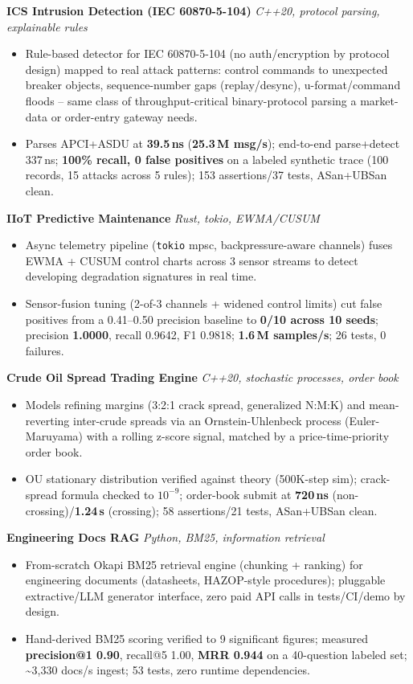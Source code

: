 \documentclass[10pt]{article}
\newcommand{\projectentry}[2]{%
  \noindent\textbf{#1} \hfill \textit{#2}\\[-0.3em]
}
\begin{document}
\projectentry{ICS Intrusion Detection (IEC 60870-5-104)}{C++20, protocol parsing, explainable rules}
\begin{itemize}
  \item Rule-based detector for IEC 60870-5-104 (no auth/encryption by protocol design) mapped to real attack patterns: control commands to unexpected breaker objects, sequence-number gaps (replay/desync), u-format/command floods -- same class of throughput-critical binary-protocol parsing a market-data or order-entry gateway needs.
  \item Parses APCI+ASDU at \textbf{39.5\,ns} (\textbf{25.3\,M msg/s}); end-to-end parse+detect 337\,ns; \textbf{100\% recall, 0 false positives} on a labeled synthetic trace (100 records, 15 attacks across 5 rules); 153 assertions/37 tests, ASan+UBSan clean.
\end{itemize}

\projectentry{IIoT Predictive Maintenance}{Rust, tokio, EWMA/CUSUM}
\begin{itemize}
  \item Async telemetry pipeline (\texttt{tokio} mpsc, backpressure-aware channels) fuses EWMA + CUSUM control charts across 3 sensor streams to detect developing degradation signatures in real time.
  \item Sensor-fusion tuning (2-of-3 channels + widened control limits) cut false positives from a 0.41--0.50 precision baseline to \textbf{0/10 across 10 seeds}; precision \textbf{1.0000}, recall 0.9642, F1 0.9818; \textbf{1.6\,M samples/s}; 26 tests, 0 failures.
\end{itemize}

\projectentry{Crude Oil Spread Trading Engine}{C++20, stochastic processes, order book}
\begin{itemize}
  \item Models refining margins (3:2:1 crack spread, generalized N:M:K) and mean-reverting inter-crude spreads via an Ornstein-Uhlenbeck process (Euler-Maruyama) with a rolling z-score signal, matched by a price-time-priority order book.
  \item OU stationary distribution verified against theory (500K-step sim); crack-spread formula checked to $10^{-9}$; order-book submit at \textbf{720\,ns} (non-crossing)/\textbf{1.24\,\textmu s} (crossing); 58 assertions/21 tests, ASan+UBSan clean.
\end{itemize}

\projectentry{Engineering Docs RAG}{Python, BM25, information retrieval}
\begin{itemize}
  \item From-scratch Okapi BM25 retrieval engine (chunking + ranking) for engineering documents (datasheets, HAZOP-style procedures); pluggable extractive/LLM generator interface, zero paid API calls in tests/CI/demo by design.
  \item Hand-derived BM25 scoring verified to 9 significant figures; measured \textbf{precision@1 0.90}, recall@5 1.00, \textbf{MRR 0.944} on a 40-question labeled set; \textasciitilde3{,}330 docs/s ingest; 53 tests, zero runtime dependencies.
\end{itemize}
\end{document}
